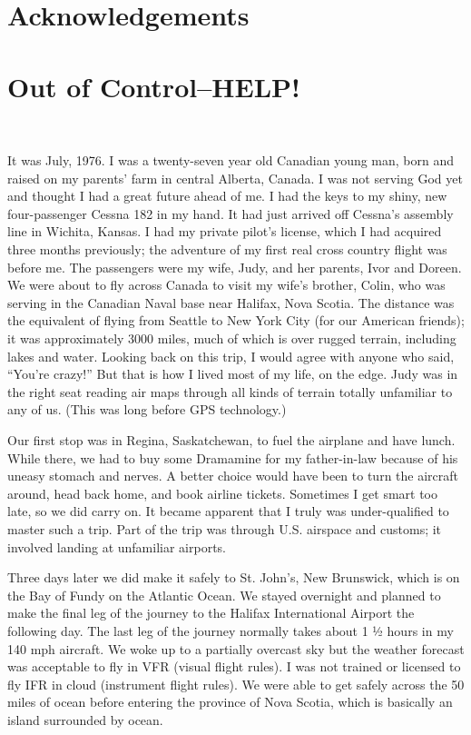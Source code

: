 \documentclass[oneside]{book}
\begin{document}
\chapter{Acknowledgements}
\lipsum[1]
\clearpage
\tableofcontents
\clearpage
\mainmatter
\chapter{Out of Control--HELP!}
\

It was July, 1976. I was a twenty-seven year old Canadian young man, born and raised on my parents’ farm in central Alberta, Canada. I was not serving God yet and thought I had a great future ahead of me. I had the keys to my shiny, new four-passenger Cessna 182 in my hand. It had just arrived off Cessna's assembly line in Wichita, Kansas. I had my private pilot's license, which I had acquired three months previously; the adventure of my first real cross country flight was before me. The passengers were my wife, Judy, and her parents, Ivor and Doreen. We were about to fly across Canada to visit my wife's brother, Colin, who was serving in the Canadian Naval base near Halifax, Nova Scotia. The distance was the equivalent of flying from Seattle to New York City (for our American friends); it was approximately 3000 miles, much of which is over rugged terrain, including lakes and water. Looking back on this trip, I would agree with anyone who said, “You’re crazy!” But that is how I lived most of my life, on the edge. Judy was in the right seat reading air maps through all kinds of terrain totally unfamiliar to any of us. (This was long before GPS technology.)

Our first stop was in Regina, Saskatchewan, to fuel the airplane and have lunch. While there, we had to buy some Dramamine for my father-in-law because of his uneasy stomach and nerves. A better choice would have been to turn the aircraft around, head back home, and book airline tickets. Sometimes I get smart too late, so we did carry on. It became apparent that I truly was under-qualified to master such a trip. Part of the trip was through U.S. airspace and customs; it involved landing at unfamiliar airports. 

Three days later we did make it safely to St. John’s, New Brunswick, which is on the Bay of Fundy on the Atlantic Ocean. We stayed overnight and planned to make the final leg of the journey to the Halifax International Airport the following day. The last leg of the journey normally takes about 1 ½ hours in my 140 mph aircraft. We woke up to a partially overcast sky but the weather forecast was acceptable to fly in VFR (visual flight rules). I was not trained or licensed to fly IFR in cloud (instrument flight rules). We were able to get safely across the 50 miles of ocean before entering the province of Nova Scotia, which is basically an island surrounded by ocean. 
\end{document}
